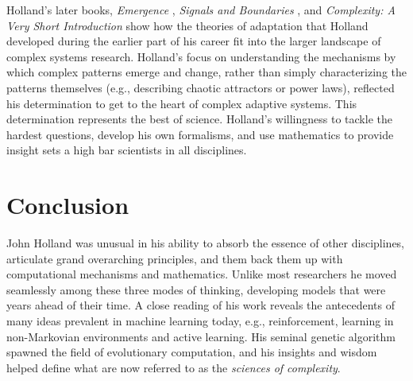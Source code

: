\documentclass{sig-alternate}
\begin{document}



Holland's later books, \emph{Emergence} \cite{Holland2000},
\emph{Signals and Boundaries} \cite{Holland2012}, and
\emph{Complexity: A Very Short Introduction} \cite{Holland2014} show how the
theories of adaptation that Holland developed during the earlier part
of his career fit into the larger landscape of complex systems
research.  Holland's focus on understanding the mechanisms by which complex patterns emerge and change,
rather than simply characterizing the patterns themselves (e.g.,
describing chaotic attractors or power laws), reflected his
determination to get to the heart of complex adaptive systems.
This determination represents the best of science.  Holland's
willingness to tackle the hardest questions, develop his own
formalisms, and use mathematics to provide insight sets a high bar 
scientists in all disciplines.



\section{Conclusion}

John Holland was unusual in his ability to absorb the essence of other
disciplines, articulate grand overarching
principles, and them back them up with computational mechanisms and
mathematics.  Unlike most researchers he moved seamlessly among these
three modes of thinking, developing models that were years ahead of their time.  A
close reading of his work reveals the antecedents of many ideas prevalent in
machine learning today, e.g., reinforcement, learning in non-Markovian
environments and active learning.   His seminal genetic algorithm
spawned the field of evolutionary computation, and his insights
and wisdom helped define what are now referred to as the
\emph{sciences of complexity}.   
\end{document}
